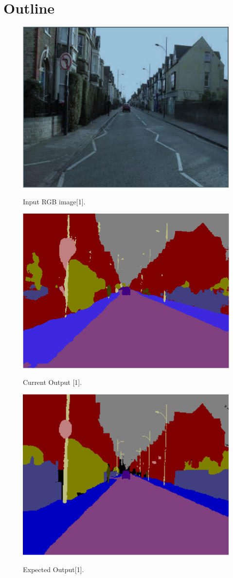 \documentclass[a4paper,12pt]{article}
\begin{document}
\section{Outline}

\begin{figure}[h!]
\centering
\hyperlink{1}{\includegraphics[width=.4\textwidth]{fig_2.png}}
\caption{Input RGB image[1].}
\end{figure}

\begin{figure}[h!]
\centering
\hyperlink{1}{\includegraphics[width=.4\textwidth]{fig_3.png}}
\caption{Current Output [1].}
\end{figure}

\begin{figure}[h!]
\centering
\hyperlink{1}{\includegraphics[width=.4\textwidth]{fig_4.png}}
\caption{Expected Output[1].}
\end{figure}

\clearpage
\end{document}
